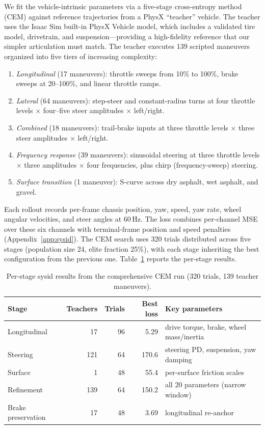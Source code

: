 We fit the vehicle-intrinsic parameters via a five-stage cross-entropy method (CEM) against reference trajectories from a PhysX ``teacher'' vehicle.
The teacher uses the Isaac Sim built-in PhysX Vehicle model, which includes a validated tire model, drivetrain, and suspension---providing a high-fidelity reference that our simpler articulation must match.
The teacher executes 139 scripted maneuvers organized into five tiers of increasing complexity:
\begin{enumerate}[leftmargin=*, itemsep=1pt]
  \item \emph{Longitudinal} (17 maneuvers): throttle sweeps from 10\% to 100\%, brake sweeps at 20--100\%, and linear throttle ramps.
  \item \emph{Lateral} (64 maneuvers): step-steer and constant-radius turns at four throttle levels $\times$ four--five steer amplitudes $\times$ left/right.
  \item \emph{Combined} (18 maneuvers): trail-brake inputs at three throttle levels $\times$ three steer amplitudes $\times$ left/right.
  \item \emph{Frequency response} (39 maneuvers): sinusoidal steering at three throttle levels $\times$ three amplitudes $\times$ four frequencies, plus chirp (frequency-sweep) steering.
  \item \emph{Surface transition} (1 maneuver): S-curve across dry asphalt, wet asphalt, and gravel.
\end{enumerate}
Each rollout records per-frame chassis position, yaw, speed, yaw rate, wheel angular velocities, and steer angles at 60\,Hz.
The loss combines per-channel MSE over these six channels with terminal-frame position and speed penalties (Appendix~\ref{app:sysid}).
The CEM search uses 320 trials distributed across five stages (population size 24, elite fraction 25\%), with each stage inheriting the best configuration from the previous one.
Table~\ref{tab:sysid_stages} reports the per-stage results.

\begin{table}[h]
\centering\small
\caption{Per-stage sysid results from the comprehensive CEM run (320 trials, 139 teacher maneuvers).}
\label{tab:sysid_stages}
\begin{tabular}{@{}lrrrl@{}}
\toprule
Stage & Teachers & Trials & Best loss & Key parameters \\
\midrule
Longitudinal         & 17  & 96 & 5.29  & drive torque, brake, wheel mass/inertia \\
Steering             & 121 & 64 & 170.6 & steering PD, suspension, yaw damping \\
Surface              & 1   & 48 & 55.4  & per-surface friction scales \\
Refinement           & 139 & 64 & 150.2 & all 20 parameters (narrow window) \\
Brake preservation   & 17  & 48 & 3.69  & longitudinal re-anchor \\
\bottomrule
\end{tabular}
\end{table}

